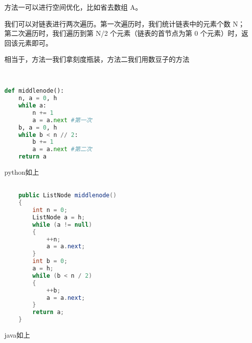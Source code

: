 方法一可以进行空间优化，比如省去数组 A。

我们可以对链表进行两次遍历。第一次遍历时，我们统计链表中的元素个数 N；第二次遍历时，我们遍历到第 N/2 个元素（链表的首节点为第 0 个元素）时，返回该元素即可。

相当于，方法一我们拿刻度瓶装，方法二我们用数豆子的方法
\begin{lstlisting}[language=python]


def middlenode():
    n, a = 0, h
    while a:
        n += 1
        a = a.next #第一次
    b, a = 0, h
    while b < n // 2:
        b += 1
        a = a.next #第二次
    return a

\end{lstlisting}
python如上
\begin{lstlisting}[language=java]

    public ListNode middlenode() 
    {
        int n = 0;
        ListNode a = h;
        while (a != null) 
        {
            ++n;
            a = a.next;
        }
        int b = 0;
        a = h;
        while (b < n / 2) 
        {
            ++b;
            a = a.next;
        }
        return a;
    }

\end{lstlisting}
java如上
